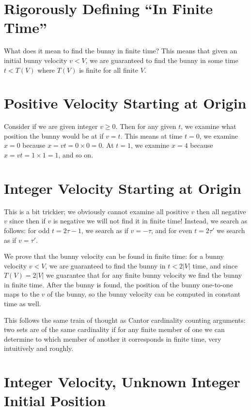 \documentclass[12pt]{report}
\newcommand*{\abs}[1]{\left|#1\right|}
\begin{document}
\section{Rigorously Defining ``In Finite Time''}

What does it mean to find the bunny in finite time? This means that given an
initial bunny velocity $v < V$, we are guaranteed to find the bunny in some time
$t < T(V)$ where $T(V)$ is finite for all finite $V$.

\section{Positive Velocity Starting at Origin}

Consider if we are given integer $v \geq 0$. Then for any given $t$, we examine
what position the bunny would be at if $v = t$. This means at time $t = 0$, we
examine $x = 0$ because $x = vt = 0 \times 0 = 0$. At $t = 1$, we examine $x =
4$ because $x = vt = 1 \times 1 = 1$, and so on.

\section{Integer Velocity Starting at Origin}

This is a bit trickier; we obviously cannot examine all positive $v$ then all
negative $v$ since then if $v$ is negative we will not find it in finite time!
Instead, we search as follows: for odd $t = 2\tau - 1$, we search as if $v =
-\tau$, and for even $t = 2\tau'$ we search as if $v = \tau'$.

We prove that the bunny velocity can be found in finite time: for a bunny
velocity $v < V$, we are guaranteed to find the bunny in $t < 2\abs{V}$ time,
and since $T(V) = 2\abs{V}$ we guarantee that for any finite bunny velocity we
find the bunny in finite time. After the bunny is found, the position of the
bunny one-to-one maps to the $v$ of the bunny, so the bunny velocity can be
computed in constant time as well.

This follows the same train of thought as Cantor cardinality counting arguments:
two sets are of the same cardinality if for any finite member of one we can
determine to which member of another it corresponds in finite time, very
intuitively and roughly.

\section{Integer Velocity, Unknown Integer Initial Position}
\end{document}
